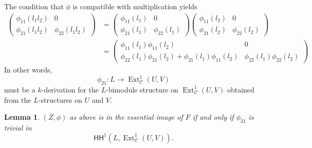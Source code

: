 \documentclass{amsart}
\numberwithin{equation}{section}
\let\cal\mathcal
\newtheorem{lemma}{Lemma}[section]
\theoremstyle{definition}
\theoremstyle{remark}
\begin{document}
The condition that $\phi$ is compatible with multiplication 
yields
\begin{align*}
\begin{pmatrix}
\phi_{11}(l_1l_2)&0\\
\phi_{21}(l_1l_2)&\phi_{22}(l_1l_2)
\end{pmatrix}
&=
\begin{pmatrix}
\phi_{11}(l_1)&0\\
\phi_{21}(l_1)&\phi_{22}(l_1)
\end{pmatrix}
\begin{pmatrix}
\phi_{11}(l_2)&0\\
\phi_{21}(l_2)&\phi_{22}(l_2)
\end{pmatrix}\\
&=\begin{pmatrix}
\phi_{11}(l_1)\phi_{11}(l_2)&0\\
\phi_{22}(l_1)\phi_{21}(l_2)+\phi_{21}(l_1)\phi_{11}(l_2)
&\phi_{22}(l_1)\phi_{22}(l_2)
\end{pmatrix}
\end{align*}
In other words,
\[
\phi_{21}:L{\rightarrow} {\operatorname {Ext}}^1_{{\cal C}}(U,V)
\]
must be a $k$-derivation for the $L$-bimodule structure on ${\operatorname {Ext}}^1_{{\cal C}}(U,V)$
obtained from the $L$-structures on $U$ and $V$. 
\begin{lemma}
\label{ref-6.2-35} $(Z,\phi)$ as above is in the essential image of $F$
if and only if $\phi_{21}$ is trivial in
\[
{\mathsf{HH}}^1(L,{\operatorname {Ext}}^1_{{\cal C}}(U,V)).
\]
\end{lemma}
\end{document}
